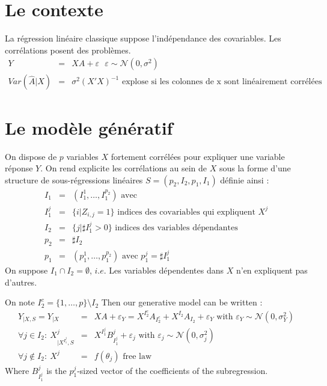 \documentclass[12pt]{article}
\begin{document}
\section{Le contexte}
	La régression linéaire classique suppose l'indépendance des covariables. Les corrélations posent des problèmes.
	\begin{eqnarray}
		Y&=&XA+\varepsilon \ \ \ \varepsilon\sim \mathcal{N}(0,\sigma^2) \\
		Var(\hat{A}|X)&=& \sigma^2(X'X)^{-1} \textrm{ explose si les colonnes de x sont linéairement corrélées}
	\end{eqnarray}
			
	
	
\section{Le modèle génératif}
On dispose de $p$ variables $X$ fortement corrélées pour expliquer une variable réponse $Y$.
On rend explicite les corrélations au sein de $X$ sous la forme d'une structure de sous-régressions linéaires $S=(p_2,I_2,p_1,I_1)$ définie ainsi :
	\begin{eqnarray}
		I_1&=&(I_1^1,\dots,I_1^{p_2}) \textrm{ avec}		\\
		I_1^j &=& \{i |Z_{i,j}=1 \} \textrm{ indices des covariables qui expliquent $X^j$} \\
		I_2&=&\{j |\sharp I_1^j>0 \}  \textrm{ indices des variables dépendantes} \\
		p_2&=& \sharp I_2 \\
		p_1&=&(p_1^1,\dots,p_1^{p_2}) \textrm{ avec }p_1^j=\sharp I_1^j 
	\end{eqnarray}
	On suppose $I_1\cap I_2=\emptyset$, $i.e.$ Les variables dépendentes dans $X$ n'en expliquent pas d'autres. 
	
	On note $I_2^c=\{1,\dots,p\}\setminus I_2$
Then our generative model can be written :
\begin{eqnarray}
	Y_{|X,S}=Y_{|X}&=&XA+\varepsilon_Y= X^{I_2^c}A_{I_2^c}+X^{I_2}A_{I_2}+\varepsilon_Y \textrm{ with } \varepsilon_Y \sim \mathcal{N}(0,\sigma_Y^2) \label{MainR}\\
	\forall j \in I_2 : \  X^j_{|X^{I_1^j},S}&=&X^{I_1^j}B_{I_1^j}^j + \varepsilon_{j} \textrm{ with } \varepsilon_j \sim \mathcal{N}(0,\sigma_j^2) \label{SR}\\
    \forall j \notin I_2 : \ X^j &=& f(\theta_j) \textrm{ free law}	
\end{eqnarray}
Where $B_{I_1^j}^j$ is the $p_1^j$-sized vector of the coefficients of the subregression.
\end{document}

